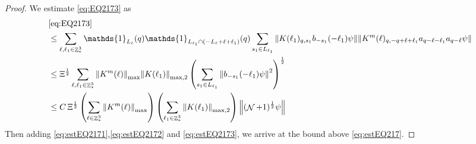 \documentclass[sn-mathphys, Numbered ,a4paper]{sn-jnl}%
\DeclareMathOperator{\Z}{\mathbb{Z}}
\DeclareMathOperator{\NN}{\mathcal{N}}
\newcommand{\half}{\frac{1}{2}}
\theoremstyle{plain}
\theoremstyle{definition}
\theoremstyle{remark}
\theoremstyle{plain}
\theoremstyle{definition}
\theoremstyle{remark}
\begin{document}
\begin{proof}
We estimate \eqref{eq:EQ2173} as
\begin{align}
	&\eqref{eq:EQ2173}\nonumber\\
	&\leq\sum\limits_{\ell, \ell_1\in \Z^3_*} \mathds{1}_{L_{\ell}}(q) \mathds{1}_{L_{\ell_1}\cap (-L_{\ell}+\ell+\ell_1)}(q) \sum\limits_{s_1\in L_{\ell_1}} \norm{ K(\ell_1)_{q,s_1} b_{-s_1}(-\ell_1) \psi}\norm{ K^m(\ell)_{q,-q+\ell+\ell_1} a_{q-\ell-\ell_1} a_{q-\ell} \psi }\nonumber\\
	&\leq \Xi^\half \sum\limits_{\ell, \ell_1\in \Z^3_*} \norm{K^m(\ell)}_{\mathrm{max}} \norm{K(\ell_1)}_{\mathrm{max,2}} \left(\sum\limits_{s_1 \in L_{\ell_1}} \norm{ b_{-s_1}(-\ell_1) \psi}^2\right)^\half  \nonumber\\ 
	&\leq C\, \Xi^\half \left(\sum\limits_{\ell \in \Z^3_*} \norm{K^m(\ell)}_{\mathrm{max}}\right)\left( \sum\limits_{\ell_1\in \Z^3_*} \norm{ K(\ell_1)}_{\mathrm{max,2}} \right) \norm{(\NN+1)^\half\psi}\label{eq:estEQ2173}
\end{align}
Then adding \eqref{eq:estEQ2171},\eqref{eq:estEQ2172} and \eqref{eq:estEQ2173}, we arrive at the bound above \eqref{eq:estEQ217}. 
\end{proof}
\end{document}
